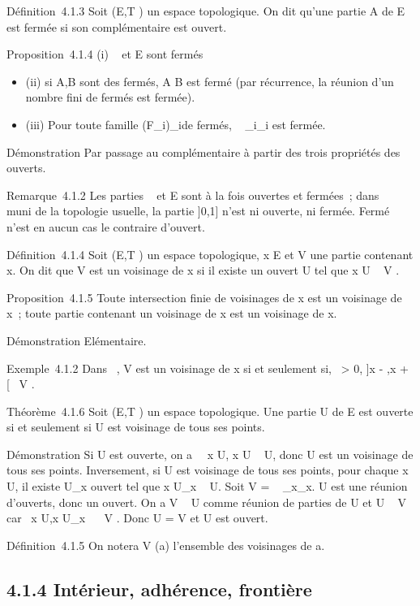 \documentclass[]{article}
\begin{document}
Définition~4.1.3 Soit (E,T ) un espace topologique. On dit qu'une partie
A de E est fermée si son complémentaire est ouvert.

Proposition~4.1.4 (i) \varnothing~ et E sont fermés

\begin{itemize}
\itemsep1pt\parskip0pt
\item
  (ii) si A,B sont des fermés, A \cup B est fermé (par récurrence, la
  réunion d'un nombre fini de fermés est fermée).
\item
  (iii) Pour toute famille (F_i)_i\inI de fermés,
  \⋂ ~
  _i\inIF_i est fermée.
\end{itemize}

Démonstration Par passage au complémentaire à partir des trois
propriétés des ouverts.

Remarque~4.1.2 Les parties \varnothing~ et E sont à la fois ouvertes et fermées~;
dans ~ muni de la topologie usuelle, la partie ]0,1] n'est ni
ouverte, ni fermée. Fermé n'est en aucun cas le contraire d'ouvert.

Définition~4.1.4 Soit (E,T ) un espace topologique, x \in E et V une
partie contenant x. On dit que V est un voisinage de x si il existe un
ouvert U tel que x \in U \subset~ V .

Proposition~4.1.5 Toute intersection finie de voisinages de x est un
voisinage de x~; toute partie contenant un voisinage de x est un
voisinage de x.

Démonstration Elémentaire.

Exemple~4.1.2 Dans ~, V est un voisinage de x si et seulement si,
\exists~\epsilon > 0, ]x - \epsilon,x + \epsilon[\subset~ V .

Théorème~4.1.6 Soit (E,T ) un espace topologique. Une partie U de E est
ouverte si et seulement si U est voisinage de tous ses points.

Démonstration Si U est ouverte, on a \forall~~x \in U, x
\in U \subset~ U, donc U est un voisinage de tous ses points. Inversement, si U
est voisinage de tous ses points, pour chaque x \in U, il existe
U_x ouvert tel que x \in U_x \subset~ U. Soit V
= \⋃ ~
_x\inUU_x. U est une réunion d'ouverts, donc un ouvert. On
a V \subset~ U comme réunion de parties de U et U \subset~ V car
\forall~x \in U,x \in U_x~ \subset~ V . Donc U = V et U
est ouvert.

Définition~4.1.5 On notera V (a) l'ensemble des voisinages de a.

\subsection{4.1.4 Intérieur, adhérence, frontière}
\end{document}
